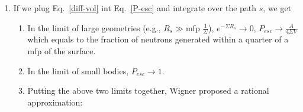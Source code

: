 \documentclass{school-22.211-notes}
\begin{document}
\begin{enumerate}
\item If we plug Eq.~\ref{diff-vol} int Eq.~\ref{P-esc} and integrate over the path $s$, we get 
\begin{enumerate}
\item In the limit of large geometries (e.g., $R_s \gg $mfp $\frac{1}{\Sigma}$), $e^{-\Sigma R_s} \to 0$, $P_{esc} \to \frac{A}{4\Sigma V}$ which equals to the fraction of neutrons generated within a quarter of a mfp of the surface.  

\item In the limit of small bodies, $P_{esc} \to 1$. 

\item Putting the above two limits together, Wigner proposed a rational approximation: 
\end{enumerate}


\end{enumerate}
\end{document}

